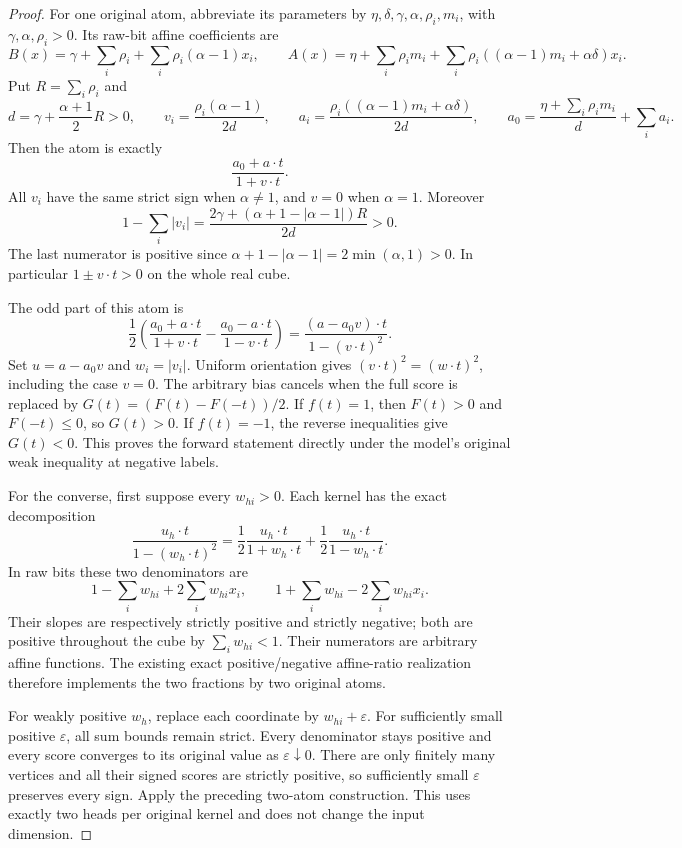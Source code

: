 \documentclass[11pt]{article}
\begin{document}
\begin{proof}
For one original atom, abbreviate its parameters by
$\eta,\delta,\gamma,\alpha,\rho_i,m_i$, with
$\gamma,\alpha,\rho_i>0$. Its raw-bit affine coefficients are
\[
 B(x)=\gamma+\sum_i\rho_i+\sum_i\rho_i(\alpha-1)x_i,
 \qquad
 A(x)=\eta+\sum_i\rho_i m_i+
       \sum_i\rho_i((\alpha-1)m_i+\alpha\delta)x_i.
\]
Put $R=\sum_i\rho_i$ and
\[
 d=\gamma+\frac{\alpha+1}{2}R>0,\qquad
 v_i=\frac{\rho_i(\alpha-1)}{2d},\qquad
 a_i=\frac{\rho_i((\alpha-1)m_i+\alpha\delta)}{2d},
 \qquad
 a_0=\frac{\eta+\sum_i\rho_i m_i}{d}+\sum_i a_i.
\]
Then the atom is exactly
\[
 \frac{a_0+a\cdot t}{1+v\cdot t}.
\]
All $v_i$ have the same strict sign when $\alpha\ne1$, and $v=0$ when
$\alpha=1$. Moreover
\[
 1-\sum_i|v_i|
 =\frac{2\gamma+(\alpha+1-|\alpha-1|)R}{2d}>0.
\]
The last numerator is positive since
$\alpha+1-|\alpha-1|=2\min(\alpha,1)>0$.
In particular $1\pm v\cdot t>0$ on the whole real cube.

The odd part of this atom is
\[
 \frac12\left(
   \frac{a_0+a\cdot t}{1+v\cdot t}
  -\frac{a_0-a\cdot t}{1-v\cdot t}\right)
 =\frac{(a-a_0v)\cdot t}{1-(v\cdot t)^2}.
\]
Set $u=a-a_0v$ and $w_i=|v_i|$. Uniform orientation gives
$(v\cdot t)^2=(w\cdot t)^2$, including the case $v=0$.
The arbitrary bias cancels when the full score is replaced by
$G(t)=(F(t)-F(-t))/2$.
If $f(t)=1$, then $F(t)>0$ and $F(-t)\leq0$, so $G(t)>0$.
If $f(t)=-1$, the reverse inequalities give $G(t)<0$.
This proves the forward statement directly under the model's original
weak inequality at negative labels.

For the converse, first suppose every $w_{hi}>0$. Each kernel has the
exact decomposition
\[
 \frac{u_h\cdot t}{1-(w_h\cdot t)^2}
 =\frac12\frac{u_h\cdot t}{1+w_h\cdot t}
  +\frac12\frac{u_h\cdot t}{1-w_h\cdot t}.
\]
In raw bits these two denominators are
\[
 1-\sum_iw_{hi}+2\sum_iw_{hi}x_i,
 \qquad
 1+\sum_iw_{hi}-2\sum_iw_{hi}x_i.
\]
Their slopes are respectively strictly positive and strictly negative;
both are positive throughout the cube by $\sum_iw_{hi}<1$.
Their numerators are arbitrary affine functions. The existing exact
positive/negative affine-ratio realization therefore implements the two
fractions by two original atoms.

For weakly positive $w_h$, replace each coordinate by $w_{hi}+\varepsilon$.
For sufficiently small positive $\varepsilon$, all sum bounds remain
strict. Every denominator stays positive and every score converges to
its original value as $\varepsilon\downarrow0$. There are only finitely
many vertices and all their signed scores are strictly positive, so
sufficiently small $\varepsilon$ preserves every sign. Apply the preceding
two-atom construction. This uses exactly two heads per original kernel
and does not change the input dimension.
\end{proof}
\end{document}

